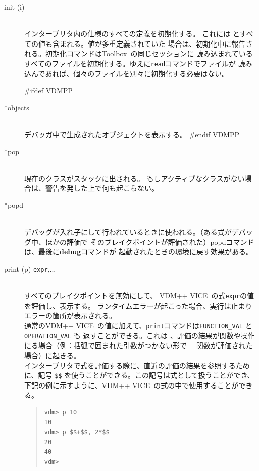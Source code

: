 \documentclass[\pformat,12pt]{article}
\newcommand{\vdmslpp}{VDM-SL}
\newcommand{\Toolbox}{Toolbox}
\newcommand{\vdmslpp}{VDM++}
\newcommand{\Toolbox}{Toolbox}
\renewcommand{\vdmslpp}{VDM++ VICE}
\begin{document}
\begin{description}
\item[init (i)] \mbox{}\\
  インタープリタ内の仕様のすべての定義を初期化する。
  これには
  とすべての値も含まれる。値が多重定義されていた
  場合は、初期化中に報告される。初期化コマンドは\Toolbox\ の同じセッションに
  読み込まれているすべてのファイルを初期化する。ゆえに{\tt read}コマンドでファイルが
  読み込んであれば、個々のファイルを別々に初期化する必要はない。

#ifdef VDMPP
\item[*objects] \mbox{}\\
  デバッガ中で生成されたオブジェクトを表示する。
#endif VDMPP

\item[*pop] \mbox{}\\
  現在のクラスがスタックに出される。
  もしアクティブなクラスがない場合は、警告を発した上で何も起こらない。

\item[*popd] \mbox{}\\
  デバッグが入れ子にして行われているときに使われる。（ある式がデバッグ中、ほかの評価で
  そのブレイクポイントが評価された）popdコマンドは、最後に\textbf{debug}コマンドが
  起動されたときの環境に戻す効果がある。
 
\item[print (p) {\tt expr},...] \mbox{}\\
  すべてのブレイクポイントを無効にして、 \vdmslpp\ の式{\tt expr}の値を評価し、表示する。
  ランタイムエラーが起こった場合、実行は止まりエラーの箇所が表示される。\\
  
  通常の\vdmslpp\ の値に加えて、{\tt print}コマンドは{\tt FUNCTION\_VAL}  と{\tt OPERATION\_VAL} も
  返すことができる。これは 、評価の結果が関数や操作にる場合（例：括弧で囲まれた引数がつかない形で
　関数が評価された場合）に起きる。\\
  
  インタープリタで式を評価する際に、直近の評価の結果を参照するために、記号
   {\tt \$\$}\index{\$\$} を使うことができる。この記号は式として扱うことができ、
  下記の例に示すように、\vdmslpp\ の式の中で使用することができる。

\begin{quote}
\begin{verbatim}
vdm> p 10
10
vdm> p $$+$$, 2*$$
20
40
vdm> 
\end{verbatim}
\end{quote}


\end{description}
\end{document}

